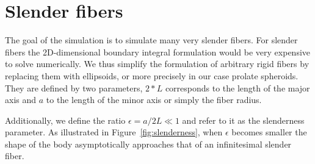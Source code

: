 \documentclass[a4paper,11pt]{kth-mag}
\begin{document}
\section{Slender fibers}

The goal of the simulation is to simulate many very slender fibers. For slender fibers the 2D-dimensional boundary integral formulation would be very expensive to solve numerically. We thus simplify the formulation of arbitrary rigid fibers by replacing them with ellipsoids, or more precisely in our case prolate spheroids. They are defined by two parameters, $2*L$ corresponds to the length of the major axis and $a$ to the length of the minor axis or simply the fiber radius.

Additionally, we define the ratio $\epsilon = a / 2 L \ll 1$ and refer to it as the slenderness parameter. As illustrated in Figure~\ref{fig:slenderness}, when $\epsilon$ becomes smaller the shape of the body asymptotically approaches that of an infinitesimal slender fiber.
\end{document}

